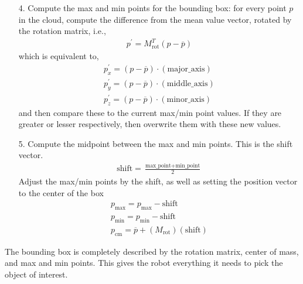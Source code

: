 \documentclass[journal]{IEEEtran}
\begin{document}
\begin{enumerate}
\item[4.] Compute the max and min points for the bounding box: for every point $p$ in the cloud, compute the difference from the mean value vector, rotated by the rotation matrix, i.e.,
\begin{align}
	p^{\prime} = M_{\text{rot}}^T (p - \overline{p})
\end{align}
which is equivalent to,
\begin{align}
	p_x^{\prime} = (p - \overline{p}) \cdot (\text{major\_axis})\\
	p_y^{\prime} = (p - \overline{p}) \cdot (\text{middle\_axis})\\
	p_z^{\prime} = (p - \overline{p}) \cdot (\text{minor\_axis})
\end{align}
and then compare these to the current max/min point values.  If they are greater or lesser respectively, then overwrite them with these new values.
\item[5.] Compute the midpoint between the max and min points.  This is the shift vector.
\begin{align}
	\text{shift} = 	\frac{\text{max\_point} + \text{min\_point}}{2}
\end{align}
Adjust the max/min points by the shift, as well as setting the position vector to the center of the box
\begin{align}
	p_{\text{max}} = p_{\text{max}} - \text{shift} \\ p_{\text{min}} = p_{\text{min}} - \text{shift}\\ p_{\text{cm}} = \overline{p} + (M_{\text{rot}})( \text{shift})
\end{align}





\end{enumerate}
The bounding box is completely described by the rotation matrix, center of mass, and max and min points.  This gives the robot everything it needs to pick the object of interest.
\end{document}
